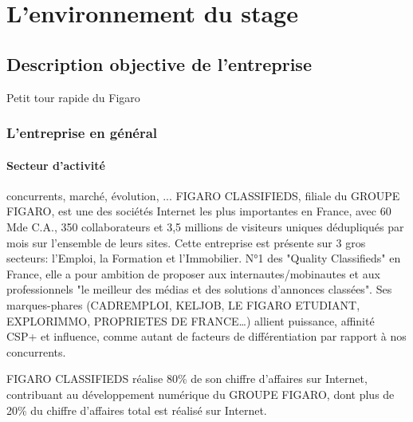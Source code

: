 
\chapter{L'environnement du stage} %

\label{environnement} %



\section{Description objective de l'entreprise}

Petit tour rapide du Figaro


\subsection{L'entreprise en général}

\subsubsection{Secteur d'activité}

concurrents, marché, évolution, ...
FIGARO CLASSIFIEDS, filiale du GROUPE FIGARO, est une des sociétés Internet les plus importantes en France, avec 60 M\texteuro de C.A., 350 collaborateurs et 3,5 millions de visiteurs uniques dédupliqués par mois sur l’ensemble de leurs sites.
Cette entreprise est présente sur 3 gros secteurs: l’Emploi, la Formation et l’Immobilier.
N°1 des "Quality Classifieds" en France, elle a pour ambition de proposer aux internautes/mobinautes et aux professionnels "le meilleur des médias et des solutions d’annonces classées".
Ses marques-phares (CADREMPLOI, KELJOB, LE FIGARO ETUDIANT, EXPLORIMMO, PROPRIETES DE FRANCE…) allient puissance, affinité CSP+ et influence, comme autant de facteurs de différentiation par rapport à nos concurrents.

FIGARO CLASSIFIEDS réalise 80\% de son chiffre d’affaires sur Internet, contribuant au développement numérique du GROUPE FIGARO, dont plus de 20\% du chiffre d’affaires total est réalisé sur Internet.

